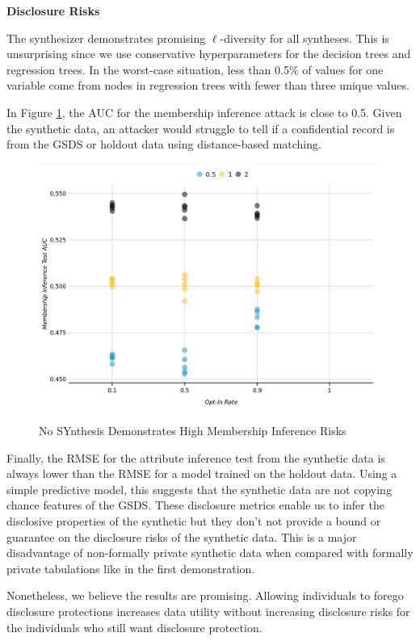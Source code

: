 \documentclass[
]{urban-formatting}
\begin{document}
\textbf{Disclosure Risks}

The synthesizer demonstrates promising \(\ell\)-diversity for all
syntheses. This is unsurprising since we use conservative
hyperparameters for the decision trees and regression trees. In the
worst-case situation, less than 0.5\% of values for one variable come
from nodes in regression trees with fewer than three unique values.

In Figure \ref{fig:membership}, the AUC for the membership inference
attack is close to 0.5. Given the synthetic data, an attacker would
struggle to tell if a confidential record is from the GSDS or holdout
data using distance-based matching.

\begin{figure}[!htb]
    \caption{No SYnthesis Demonstrates High Membership Inference Risks}
    \centering
    \includegraphics[width=6.5in]{../analysis/figures/membership-inference-1.png}
    \label{fig:membership}
\end{figure}

Finally, the RMSE for the attribute inference test from the synthetic
data is always lower than the RMSE for a model trained on the holdout
data. Using a simple predictive model, this suggests that the synthetic
data are not copying chance features of the GSDS. These disclosure
metrics enable us to infer the disclosive properties of the synthetic
but they don't not provide a bound or guarantee on the disclosure risks
of the synthetic data. This is a major disadvantage of non-formally
private synthetic data when compared with formally private tabulations
like in the first demonstration.

Nonetheless, we believe the results are promising. Allowing individuals
to forego disclosure protections increases data utility without
increasing disclosure risks for the individuals who still want
disclosure protection.
\end{document}
